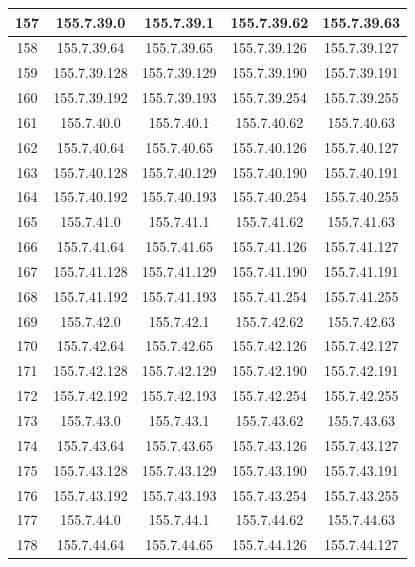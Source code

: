 \documentclass[letterpaper,12pt]{article}
\begin{document}
\begin{longtable}{|c|c|c|c|c|}
        157 & 155.7.39.0 & 155.7.39.1 & 155.7.39.62 & 155.7.39.63 \\ \hline
        158 & 155.7.39.64 & 155.7.39.65 & 155.7.39.126 & 155.7.39.127 \\ \hline
        159 & 155.7.39.128 & 155.7.39.129 & 155.7.39.190 & 155.7.39.191 \\ \hline
        160 & 155.7.39.192 & 155.7.39.193 & 155.7.39.254 & 155.7.39.255 \\ \hline
        161 & 155.7.40.0 & 155.7.40.1 & 155.7.40.62 & 155.7.40.63 \\ \hline
        162 & 155.7.40.64 & 155.7.40.65 & 155.7.40.126 & 155.7.40.127 \\ \hline
        163 & 155.7.40.128 & 155.7.40.129 & 155.7.40.190 & 155.7.40.191 \\ \hline
        164 & 155.7.40.192 & 155.7.40.193 & 155.7.40.254 & 155.7.40.255 \\ \hline
        165 & 155.7.41.0 & 155.7.41.1 & 155.7.41.62 & 155.7.41.63 \\ \hline
        166 & 155.7.41.64 & 155.7.41.65 & 155.7.41.126 & 155.7.41.127 \\ \hline
        167 & 155.7.41.128 & 155.7.41.129 & 155.7.41.190 & 155.7.41.191 \\ \hline
        168 & 155.7.41.192 & 155.7.41.193 & 155.7.41.254 & 155.7.41.255 \\ \hline
        169 & 155.7.42.0 & 155.7.42.1 & 155.7.42.62 & 155.7.42.63 \\ \hline
        170 & 155.7.42.64 & 155.7.42.65 & 155.7.42.126 & 155.7.42.127 \\ \hline
        171 & 155.7.42.128 & 155.7.42.129 & 155.7.42.190 & 155.7.42.191 \\ \hline
        172 & 155.7.42.192 & 155.7.42.193 & 155.7.42.254 & 155.7.42.255 \\ \hline
        173 & 155.7.43.0 & 155.7.43.1 & 155.7.43.62 & 155.7.43.63 \\ \hline
        174 & 155.7.43.64 & 155.7.43.65 & 155.7.43.126 & 155.7.43.127 \\ \hline
        175 & 155.7.43.128 & 155.7.43.129 & 155.7.43.190 & 155.7.43.191 \\ \hline
        176 & 155.7.43.192 & 155.7.43.193 & 155.7.43.254 & 155.7.43.255 \\ \hline
        177 & 155.7.44.0 & 155.7.44.1 & 155.7.44.62 & 155.7.44.63 \\ \hline
        178 & 155.7.44.64 & 155.7.44.65 & 155.7.44.126 & 155.7.44.127 \\ \hline

\end{longtable}
\end{document}
